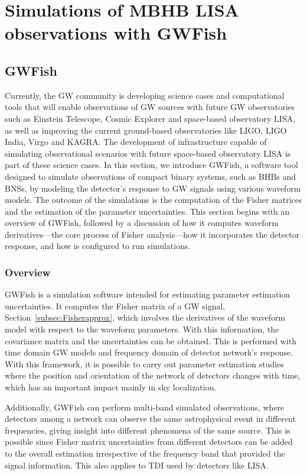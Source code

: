 \documentclass[a4paper,12pt]{article}
\begin{document}
\section{Simulations of MBHB LISA observations with GWFish}
\label{sec:simLISAGWFish}

\subsection{GWFish}
\label{GWFish}

Currently, the GW community is developing science cases and computational tools that will enable observations of GW sources with future GW observatories such as Einstein Telescope, Cosmic Explorer and space-based observatory LISA, as well as improving the current ground-based observatories like LIGO, LIGO India, Virgo and KAGRA. The development of infrastructure capable of simulating observational scenarios with future space-based observatory LISA is part of these science cases. In this section, we introduce GWFish, a software tool designed to simulate observations of compact binary systems, such as BHBs and BNSs, by modeling the detector's response to GW signals using various waveform models. The outcome of the simulations is the computation of the Fisher matrices and the estimation of the parameter uncertainties. This section begins with an overview of GWFish, followed by a discussion of how it computes waveform derivatives—the core process of Fisher analysis—how it incorporates the detector response, and how is configured to run simulations.

\subsubsection{Overview}
\label{subsec:Fisheroverview}

GWFish is a simulation software intended for estimating parameter estimation uncertainties. It computes the Fisher matrix of a GW signal, Section~\ref{subsec:Fisherapprox}, which involves the derivatives of the waveform model with respect to the waveform parameters. With this information, the covariance matrix and the uncertainties can be obtained. This is performed with time domain GW models and frequency domain of detector network's response. With this framework, it is possible to carry out parameter estimation studies where the position and orientation of the network of detectors changes with time, which has an important impact mainly in sky localization.

Additionally, GWFish can perform multi-band simulated observations, where detectors among a network can observe the same astrophysical event in different frequencies, giving insight into different phenomena of the same source. This is possible since Fisher matrix uncertainties from different detectors can be added to the overall estimation irrespective of the frequency band that provided the signal information. This also applies to TDI used by detectors like LISA.
\end{document}
